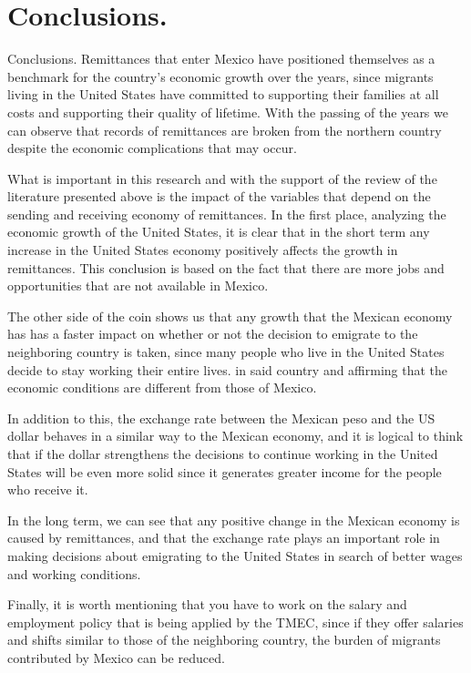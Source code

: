 \section{Conclusions.}
    \begin{frame}{Conclusions.}
Remittances that enter Mexico have positioned themselves as a benchmark for the country's economic growth over the years, since migrants living in the United States have committed to supporting their families at all costs and supporting their quality of lifetime. With the passing of the years we can observe that records of remittances are broken from the northern country despite the economic complications that may occur.\par
What is important in this research and with the support of the review of the literature presented above is the impact of the variables that depend on the sending and receiving economy of remittances. In the first place, analyzing the economic growth of the United States, it is clear that in the short term any increase in the United States economy positively affects the growth in remittances. This conclusion is based on the fact that there are more jobs and opportunities that are not available in Mexico.\par
The other side of the coin shows us that any growth that the Mexican economy has has a faster impact on whether or not the decision to emigrate to the neighboring country is taken, since many people who live in the United States decide to stay working their entire lives. in said country and affirming that the economic conditions are different from those of Mexico.\par
In addition to this, the exchange rate between the Mexican peso and the US dollar behaves in a similar way to the Mexican economy, and it is logical to think that if the dollar strengthens the decisions to continue working in the United States will be even more solid since it generates greater income for the people who receive it.\par
In the long term, we can see that any positive change in the Mexican economy is caused by remittances, and that the exchange rate plays an important role in making decisions about emigrating to the United States in search of better wages and working conditions. \par Finally, it is worth mentioning that you have to work on the salary and employment policy that is being applied by the TMEC, since if they offer salaries and shifts similar to those of the neighboring country, the burden of migrants contributed by Mexico can be reduced.\par
\end{frame}